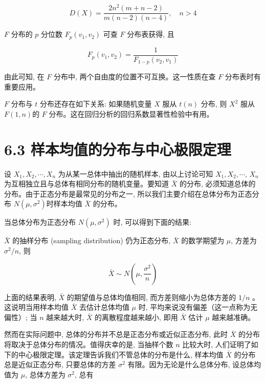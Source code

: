 \documentclass[10pt]{article}
\begin{document}
\begin{CJK*}{UTF8}{bsmi}
\begin{equation*}
D(X)=\frac{2 n^{2}(m+n-2)}{m(n-2)(n-4)}, \quad n>4 \tag{6.7}
\end{equation*}


$F$ 分布的 $p$ 分位数 $F_{p}\left(v_{1}, v_{2}\right)$ 可查 $F$ 分布表获得, 且


\begin{equation*}
F_{p}\left(v_{1}, v_{2}\right)=\frac{1}{F_{1-p}\left(v_{2}, v_{1}\right)} \tag{6.8}
\end{equation*}


由此可知, 在 $F$ 分布中, 两个自由度的位置不可互换。这一性质在查 $F$ 分布表时有重要应用。

$F$ 分布与 $t$ 分布还存在如下关系: 如果随机变量 $X$ 服从 $t(n)$ 分布, 则 $X^{2}$ 服从 $F(1, n)$的 $F$ 分布。这在回归分析的回归系数显著性检验中有用。

\section*{6.3 样本均值的分布与中心极限定理}
设 $X_{1}, X_{2}, \cdots, X_{n}$ 为从某一总体中抽出的随机样本, 由以上讨论可知 $X_{1}, X_{2}, \cdots$, $X_{n}$ 为互相独立且与总体有相同分布的随机变量。要知道 $\bar{X}$ 的分布, 必须知道总体的分布。由于正态分布是最常见的分布之一, 所以我们主要介绍在总体分布为正态分布 $N\left(\mu, \sigma^{2}\right)$时样本均值 $\bar{X}$ 的分布。

当总体分布为正态分布 $N\left(\mu, \sigma^{2}\right)$ 时, 可以得到下面的结果:

$\bar{X}$ 的抽样分布 (sampling distribution) 仍为正态分布, $\bar{X}$ 的数学期望为 $\mu$, 方差为 $\sigma^{2} / n$, 则


\begin{equation*}
\bar{X} \sim N\left(\mu, \frac{\sigma^{2}}{n}\right) \tag{6.9}
\end{equation*}


上面的结果表明, $\bar{X}$ 的期望值与总体均值相同, 而方差则缩小为总体方差的 $1 / n$ 。这说明当用样本均值 $\bar{X}$ 去估计总体均值 $\mu$ 时, 平均来说没有偏差（这一点称为无偏性）; 当 $n$ 越来越大时, $\bar{X}$ 的离散程度越来越小, 即用 $\bar{X}$ 估计 $\mu$ 越来越准确。

然而在实际问题中, 总体的分布并不总是正态分布或近似正态分布, 此时 $\bar{X}$ 的分布\\
将取决于总体分布的情况。值得庆幸的是, 当抽样个数 $n$ 比较大时, 人们证明了如下的中心极限定理。该定理告诉我们不管总体的分布是什么, 样本均值 $\bar{X}$ 的分布总是近似正态分布, 只要总体的方差 $\sigma^{2}$ 有限。因为无论是什么总体分布, 设总体均值为 $\mu$, 总体方差为 $\sigma^{2}$, 总有



\end{CJK*}
\end{document}
